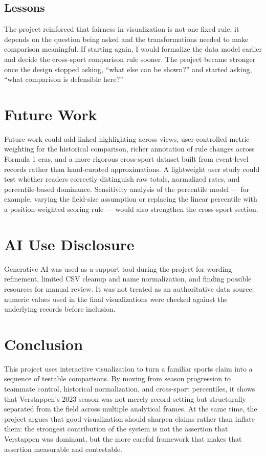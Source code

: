 \documentclass[conference]{IEEEtran}
\begin{document}
\subsection{Lessons}
The project reinforced that fairness in visualization is not one fixed rule; it depends on the question being asked and the transformations needed to make comparison meaningful. If starting again, I would formalize the data model earlier and decide the cross-sport comparison rule sooner. The project became stronger once the design stopped asking, ``what else can be shown?'' and started asking, ``what comparison is defensible here?''

\section{Future Work}
Future work could add linked highlighting across views, user-controlled metric weighting for the historical comparison, richer annotation of rule changes across Formula 1 eras, and a more rigorous cross-sport dataset built from event-level records rather than hand-curated approximations. A lightweight user study could test whether readers correctly distinguish raw totals, normalized rates, and percentile-based dominance. Sensitivity analysis of the percentile model --- for example, varying the field-size assumption or replacing the linear percentile with a position-weighted scoring rule --- would also strengthen the cross-sport section.

\section{AI Use Disclosure}
Generative AI was used as a support tool during the project for wording refinement, limited CSV cleanup and name normalization, and finding possible resources for manual review. It was not treated as an authoritative data source: numeric values used in the final visualizations were checked against the underlying records before inclusion.

\section{Conclusion}
This project uses interactive visualization to turn a familiar sports claim into a sequence of testable comparisons. By moving from season progression to teammate control, historical normalization, and cross-sport percentiles, it shows that Verstappen's 2023 season was not merely record-setting but structurally separated from the field across multiple analytical frames. At the same time, the project argues that good visualization should sharpen claims rather than inflate them: the strongest contribution of the system is not the assertion that Verstappen was dominant, but the more careful framework that makes that assertion measurable and contestable.



\end{document}
